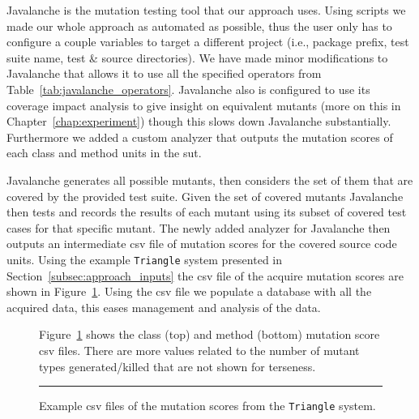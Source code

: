 Javalanche is the mutation testing tool that our approach uses. Using scripts we made our whole approach as automated as possible, thus the user only has to configure a couple variables to target a different project (i.e., package prefix, test suite name, test \& source directories). We have made minor modifications to Javalanche that allows it to use all the specified operators from Table~\ref{tab:javalanche_operators}. Javalanche also is configured to use its coverage impact analysis to give insight on equivalent mutants (more on this in Chapter~\ref{chap:experiment}) though this slows down Javalanche substantially. Furthermore we added a custom analyzer that outputs the mutation scores of each class and method units in the \gls{sut}.

Javalanche generates all possible mutants, then considers the set of them that are covered by the provided test suite. Given the set of covered mutants Javalanche then tests and records the results of each mutant using its subset of covered test cases for that specific mutant. The newly added analyzer for Javalanche then outputs an intermediate \gls{csv} file of mutation scores for the covered source code units. Using the example \texttt{Triangle} system presented in Section~\ref{subsec:approach_inputs} the \gls{csv} file of the acquire mutation scores are shown in Figure~\ref{fig:triangle_mutation_scores}. Using the \gls{csv} file we populate a database with all the acquired data, this eases management and analysis of the data.

\begin{figure}[h]
  \centering
  
  
  \caption{Example \gls{csv} files of the mutation scores from the \texttt{Triangle} system.}
  \vspace{1mm}
  \footnotesize{Figure~\ref{fig:triangle_mutation_scores} shows the class (top) and method (bottom) mutation score \gls{csv} files. There are more values related to the number of mutant types generated/killed that are not shown for terseness.}
  \vspace{2mm}
  \hrule
  \label{fig:triangle_mutation_scores}
\end{figure}


